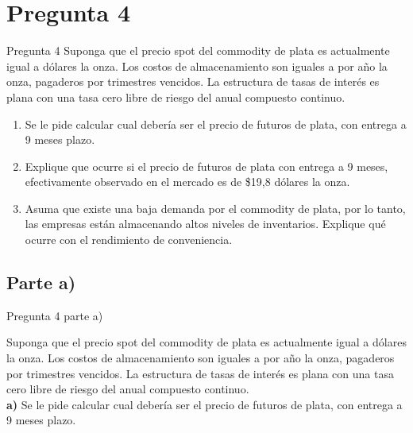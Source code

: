 \documentclass{beamer}
\begin{document}

\section{Pregunta 4}

  \begin{frame}{Pregunta 4}
    \justify
    Suponga que el precio spot del commodity de plata es actualmente igual a \dinero{\plata} dólares  
    la onza. Los costos de almacenamiento son iguales a \dinero{\almacenamiento}por año la onza, pagaderos por
    trimestres vencidos. La estructura de tasas de interés es plana con una tasa cero libre 
    de riesgo del \porcentaje{\tlr} anual compuesto continuo.
    \begin{enumerate}[label=\textbf{\alph*)}]
    \item   Se le pide calcular cual debería ser el precio de futuros de plata, con entrega a 9 meses plazo.
    \item 	Explique que ocurre si el precio de futuros de plata con entrega a 9 meses,
    efectivamente observado en el mercado es de \$19,8 dólares la onza.
    \item 	Asuma que existe una baja demanda por el commodity de plata, por lo tanto, las empresas están 
    almacenando altos niveles de inventarios. Explique qué ocurre con el rendimiento de conveniencia.
    
  \end{enumerate}
  \end{frame}

  \subsection{Parte a)}

  \begin{frame}{Pregunta 4 parte a)}
    \justify

  Suponga que el precio spot del commodity de plata es actualmente igual a \dinero{\plata} dólares  
  la onza. Los costos de almacenamiento son iguales a \dinero{\almacenamiento} por año la onza, pagaderos por
  trimestres vencidos. La estructura de tasas de interés es plana con una tasa cero libre 
  de riesgo del \porcentaje{\tlr} anual compuesto continuo.\\
  \vspace{.5em}
  \textbf{a)} Se le pide calcular cual debería ser el precio de futuros de plata, con entrega a 9 meses plazo.

  \end{frame}
\end{document}
